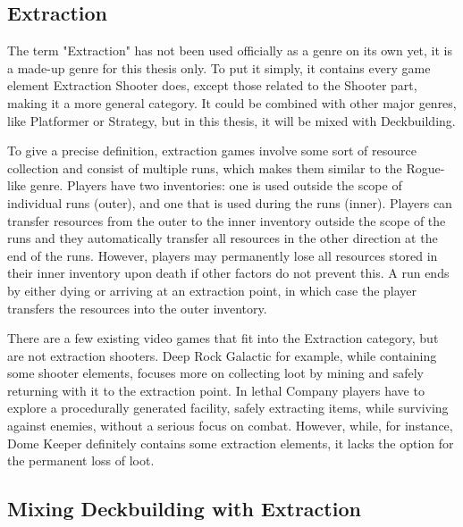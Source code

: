 \subsection{Extraction}

The term "Extraction" has not been used officially as a genre on its own yet, it is a made-up genre for this thesis only. To put it simply, it contains every game element Extraction Shooter does, except those related to the Shooter part, making it a more general category. It could be combined with other major genres, like Platformer or Strategy, but in this thesis, it will be mixed with Deckbuilding. 


To give a precise definition, extraction games involve some sort of resource collection and consist of multiple runs, which makes them similar to the Rogue-like genre. Players have two inventories: one is used outside the scope of individual runs (outer), and one that is used during the runs (inner). Players can transfer resources from the outer to the inner inventory outside the scope of the runs and they automatically transfer all resources in the other direction at the end of the runs. However, players may permanently lose all resources stored in their inner inventory upon death if other factors do not prevent this. A run ends by either dying or arriving at an extraction point, in which case the player transfers the resources into the outer inventory.

There are a few existing video games that fit into the Extraction category, but are not extraction shooters. Deep Rock Galactic\cite{deepRockGalactic2018} for example, while containing some shooter elements, focuses more on collecting loot by mining and safely returning with it to the extraction point. In lethal Company\cite{lethalCompany2023} players have to explore a procedurally generated facility, safely extracting items, while surviving against enemies, without a serious focus on combat. However, while, for instance, Dome Keeper\cite{domeKeeper2022} definitely contains some extraction elements, it lacks the option for the permanent loss of loot.



\subsection{Mixing Deckbuilding with Extraction}

